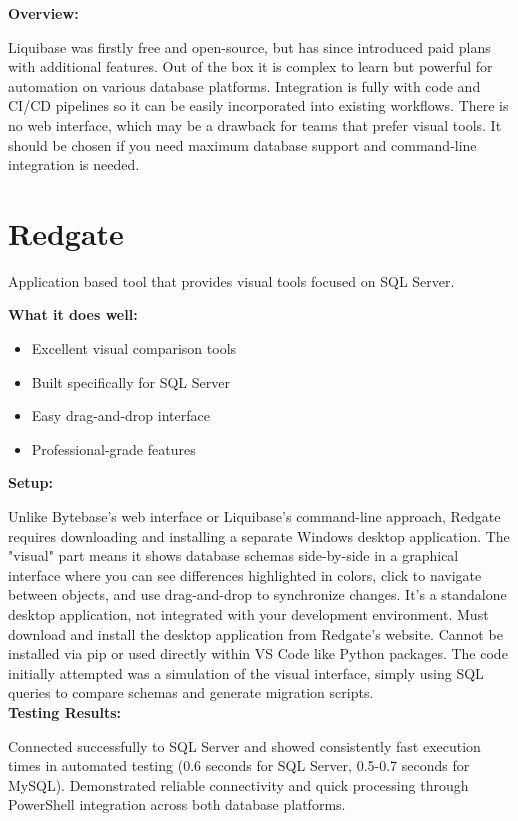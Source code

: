 \documentclass[11pt,a4paper]{article}
\begin{document}
\textbf{Overview:}

Liquibase was firstly free and open-source, but has since introduced paid plans with additional features.
Out of the box it is complex to learn but powerful for automation on various database platforms.
Integration is fully with code and CI/CD pipelines so it can be easily incorporated into existing workflows.
There is no web interface, which may be a drawback for teams that prefer visual tools.
It should be chosen if you need maximum database support and command-line integration is needed.\\

\section{Redgate}

Application based tool that provides visual tools focused on SQL Server.

\textbf{What it does well:}
\begin{itemize}
    \item Excellent visual comparison tools
    \item Built specifically for SQL Server
    \item Easy drag-and-drop interface
    \item Professional-grade features
\end{itemize}

\textbf{Setup:}

Unlike Bytebase's web interface or Liquibase's command-line approach, Redgate requires downloading and installing a separate Windows desktop application.
The "visual" part means it shows database schemas side-by-side in a graphical interface where you can see differences highlighted in colors, click to navigate between objects, and use drag-and-drop to synchronize changes.
It's a standalone desktop application, not integrated with your development environment.
Must download and install the desktop application from Redgate's website.
Cannot be installed via pip or used directly within VS Code like Python packages.
The code initially attempted was a simulation of the visual interface, simply using SQL queries to compare schemas and generate migration scripts.\\

\textbf{Testing Results:}

Connected successfully to SQL Server and showed consistently fast execution times in automated testing (0.6 seconds for SQL Server, 0.5-0.7 seconds for MySQL).
Demonstrated reliable connectivity and quick processing through PowerShell integration across both database platforms.\\
\end{document}
